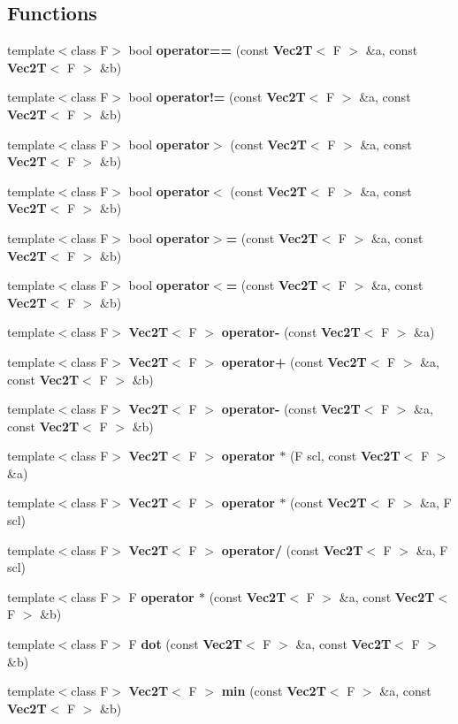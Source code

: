\subsection*{Functions}
\begin{CompactItemize}
\item 
template$<$class F$>$ bool {\bf operator==} (const {\bf Vec2T}$<$ F $>$ \&a, const {\bf Vec2T}$<$ F $>$ \&b)
\item 
template$<$class F$>$ bool {\bf operator!=} (const {\bf Vec2T}$<$ F $>$ \&a, const {\bf Vec2T}$<$ F $>$ \&b)
\item 
template$<$class F$>$ bool {\bf operator$>$} (const {\bf Vec2T}$<$ F $>$ \&a, const {\bf Vec2T}$<$ F $>$ \&b)
\item 
template$<$class F$>$ bool {\bf operator$<$} (const {\bf Vec2T}$<$ F $>$ \&a, const {\bf Vec2T}$<$ F $>$ \&b)
\item 
template$<$class F$>$ bool {\bf operator$>$=} (const {\bf Vec2T}$<$ F $>$ \&a, const {\bf Vec2T}$<$ F $>$ \&b)
\item 
template$<$class F$>$ bool {\bf operator$<$=} (const {\bf Vec2T}$<$ F $>$ \&a, const {\bf Vec2T}$<$ F $>$ \&b)
\item 
template$<$class F$>$ {\bf Vec2T}$<$ F $>$ {\bf operator-} (const {\bf Vec2T}$<$ F $>$ \&a)
\item 
template$<$class F$>$ {\bf Vec2T}$<$ F $>$ {\bf operator+} (const {\bf Vec2T}$<$ F $>$ \&a, const {\bf Vec2T}$<$ F $>$ \&b)
\item 
template$<$class F$>$ {\bf Vec2T}$<$ F $>$ {\bf operator-} (const {\bf Vec2T}$<$ F $>$ \&a, const {\bf Vec2T}$<$ F $>$ \&b)
\item 
template$<$class F$>$ {\bf Vec2T}$<$ F $>$ {\bf operator $\ast$} (F scl, const {\bf Vec2T}$<$ F $>$ \&a)
\item 
template$<$class F$>$ {\bf Vec2T}$<$ F $>$ {\bf operator $\ast$} (const {\bf Vec2T}$<$ F $>$ \&a, F scl)
\item 
template$<$class F$>$ {\bf Vec2T}$<$ F $>$ {\bf operator/} (const {\bf Vec2T}$<$ F $>$ \&a, F scl)
\item 
template$<$class F$>$ F {\bf operator $\ast$} (const {\bf Vec2T}$<$ F $>$ \&a, const {\bf Vec2T}$<$ F $>$ \&b)
\item 
template$<$class F$>$ F {\bf dot} (const {\bf Vec2T}$<$ F $>$ \&a, const {\bf Vec2T}$<$ F $>$ \&b)
\item 
template$<$class F$>$ {\bf Vec2T}$<$ F $>$ {\bf min} (const {\bf Vec2T}$<$ F $>$ \&a, const {\bf Vec2T}$<$ F $>$ \&b)
\item 

\end{CompactItemize}

